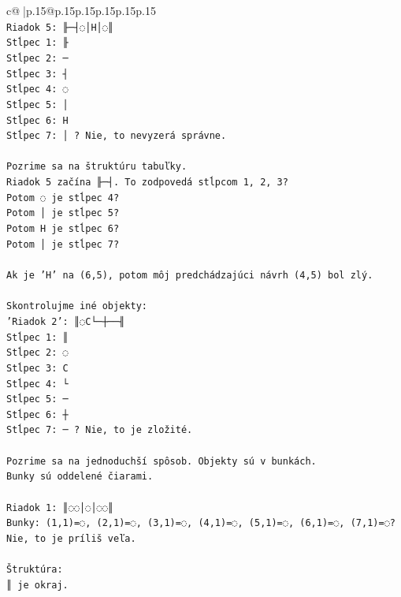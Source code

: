 \documentclass{article}
\begin{document}
{\begin{supertabular}{c@{$\;$}|p{.15\linewidth}@{}p{.15\linewidth}p{.15\linewidth}p{.15\linewidth}p{.15\linewidth}p{.15\linewidth}}
{{{\\ 
\texttt{Riadok 5: ╟─┤◌│H│◌║} \\
\texttt{Stĺpec 1: ╟} \\
\texttt{Stĺpec 2: ─} \\
\texttt{Stĺpec 3: ┤} \\
\texttt{Stĺpec 4: ◌} \\
\texttt{Stĺpec 5: │} \\
\texttt{Stĺpec 6: H} \\
\texttt{Stĺpec 7: │ ? Nie, to nevyzerá správne.} \\
\\ 
\texttt{Pozrime sa na štruktúru tabuľky.} \\
\texttt{Riadok 5 začína ╟─┤. To zodpovedá stĺpcom 1, 2, 3?} \\
\texttt{Potom ◌ je stĺpec 4?} \\
\texttt{Potom │ je stĺpec 5?} \\
\texttt{Potom H je stĺpec 6?} \\
\texttt{Potom │ je stĺpec 7?} \\
\\ 
\texttt{Ak je 'H' na (6,5), potom môj predchádzajúci návrh (4,5) bol zlý.} \\
\\ 
\texttt{Skontrolujme iné objekty:} \\
\texttt{'Riadok 2': ║◌C└─┼──╢} \\
\texttt{Stĺpec 1: ║} \\
\texttt{Stĺpec 2: ◌} \\
\texttt{Stĺpec 3: C} \\
\texttt{Stĺpec 4: └} \\
\texttt{Stĺpec 5: ─} \\
\texttt{Stĺpec 6: ┼} \\
\texttt{Stĺpec 7: ─ ? Nie, to je zložité.} \\
\\ 
\texttt{Pozrime sa na jednoduchší spôsob. Objekty sú v bunkách.} \\
\texttt{Bunky sú oddelené čiarami.} \\
\\ 
\texttt{Riadok 1: ║◌◌│◌│◌◌║} \\
\texttt{Bunky: (1,1)=◌, (2,1)=◌, (3,1)=◌, (4,1)=◌, (5,1)=◌, (6,1)=◌, (7,1)=◌? Nie, to je príliš veľa.} \\
\\ 
\texttt{Štruktúra:} \\
\texttt{║ je okraj.} \\
}}}
\end{supertabular}}
\end{document}
